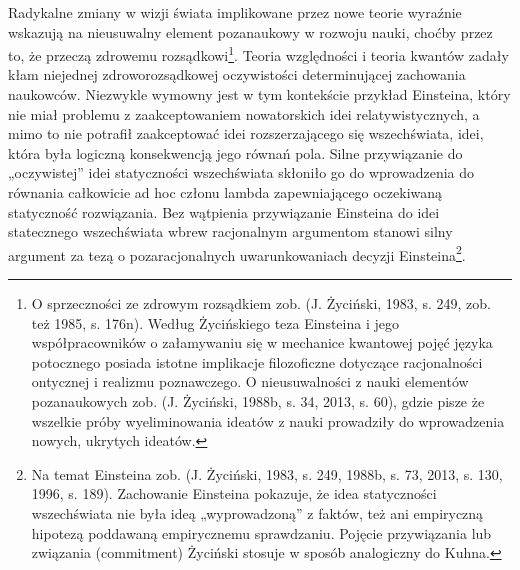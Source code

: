 \documentclass{article}
\begin{document}
Radykalne zmiany w wizji świata implikowane przez nowe teorie wyraźnie wskazują na nieusuwalny element pozanaukowy w
rozwoju nauki, choćby przez to, że przeczą zdrowemu rozsądkowi\footnote{O sprzeczności ze zdrowym rozsądkiem zob.
\label{ref:RND3LfNDVSWRv}(J. Życiński, 1983, s. 249, zob. też 1985, s. 176n). Według Życińskiego teza Einsteina i jego
współpracowników o załamywaniu się w mechanice kwantowej pojęć języka potocznego posiada istotne implikacje
filozoficzne dotyczące racjonalności ontycznej i realizmu poznawczego. O nieusuwalności z nauki elementów pozanaukowych
zob. \label{ref:RNDhn4h2RTiN2}(J. Życiński, 1988b, s. 34, 2013, s. 60), gdzie pisze że wszelkie próby wyeliminowania
ideatów z nauki prowadziły do wprowadzenia nowych, ukrytych ideatów.}. Teoria względności i teoria kwantów zadały kłam
niejednej zdroworozsądkowej oczywistości determinującej zachowania naukowców. Niezwykle wymowny jest w tym kontekście 
przykład Einsteina, który nie miał problemu z zaakceptowaniem nowatorskich idei relatywistycznych, a mimo to nie
potrafił zaakceptować idei rozszerzającego się wszechświata, idei, która była logiczną konsekwencją jego równań pola.
Silne przywiązanie do „oczywistej” idei statyczności wszechświata skłoniło go do wprowadzenia do równania całkowicie ad
hoc członu lambda zapewniającego oczekiwaną statyczność rozwiązania. Bez wątpienia przywiązanie Einsteina do idei
statecznego wszechświata wbrew racjonalnym argumentom stanowi silny argument za tezą o pozaracjonalnych uwarunkowaniach
decyzji Einsteina\footnote{Na temat Einsteina zob. \label{ref:RNDOEPytE2GkR}(J. Życiński, 1983, s. 249, 1988b, s. 73,
2013, s. 130, 1996, s. 189). Zachowanie Einsteina pokazuje, że idea statyczności wszechświata nie była ideą
„wyprowadzoną” z faktów, też ani empiryczną hipotezą poddawaną empirycznemu sprawdzaniu. Pojęcie przywiązania lub
związania (commitment) Życiński stosuje w sposób analogiczny do Kuhna.}.
\end{document}
